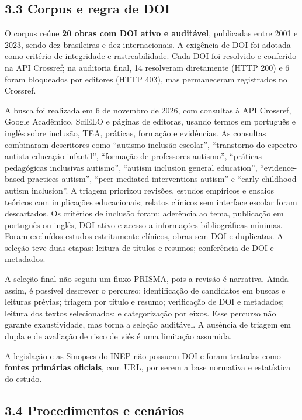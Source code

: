 \subsection{3.3 Corpus e regra de DOI}\label{corpus-e-regra-de-doi}

O corpus reúne \textbf{20 obras com DOI ativo e auditável}, publicadas
entre 2001 e 2023, sendo dez brasileiras e dez internacionais. A
exigência de DOI foi adotada como critério de integridade e
rastreabilidade. Cada DOI foi resolvido e conferido na API Crossref; na
auditoria final, 14 resolveram diretamente (HTTP 200) e 6 foram
bloqueados por editores (HTTP 403), mas permaneceram registrados no
Crossref.

A busca foi realizada em 6 de novembro de 2026, com consultas à API
Crossref, Google Acadêmico, SciELO e páginas de editoras, usando termos
em português e inglês sobre inclusão, TEA, práticas, formação e
evidências. As consultas combinaram descritores como ``autismo inclusão
escolar'', ``transtorno do espectro autista educação infantil'',
``formação de professores autismo'', ``práticas pedagógicas inclusivas
autismo'', ``autism inclusion general education'', ``evidence-based
practices autism'', ``peer-mediated interventions autism'' e ``early
childhood autism inclusion''. A triagem priorizou revisões, estudos
empíricos e ensaios teóricos com implicações educacionais; relatos
clínicos sem interface escolar foram descartados. Os critérios de
inclusão foram: aderência ao tema, publicação em português ou inglês,
DOI ativo e acesso a informações bibliográficas mínimas. Foram excluídos
estudos estritamente clínicos, obras sem DOI e duplicatas. A seleção
teve duas etapas: leitura de títulos e resumos; conferência de DOI e
metadados.

A seleção final não seguiu um fluxo PRISMA, pois a revisão é narrativa.
Ainda assim, é possível descrever o percurso: identificação de
candidatos em buscas e leituras prévias; triagem por título e resumo;
verificação de DOI e metadados; leitura dos textos selecionados; e
categorização por eixos. Esse percurso não garante exaustividade, mas
torna a seleção auditável. A ausência de triagem em dupla e de avaliação
de risco de viés é uma limitação assumida.

A legislação e as Sinopses do INEP não possuem DOI e foram tratadas como
\textbf{fontes primárias oficiais}, com URL, por serem a base normativa
e estatística do estudo.

\subsection{3.4 Procedimentos e
cenários}\label{procedimentos-e-cenuxe1rios}

